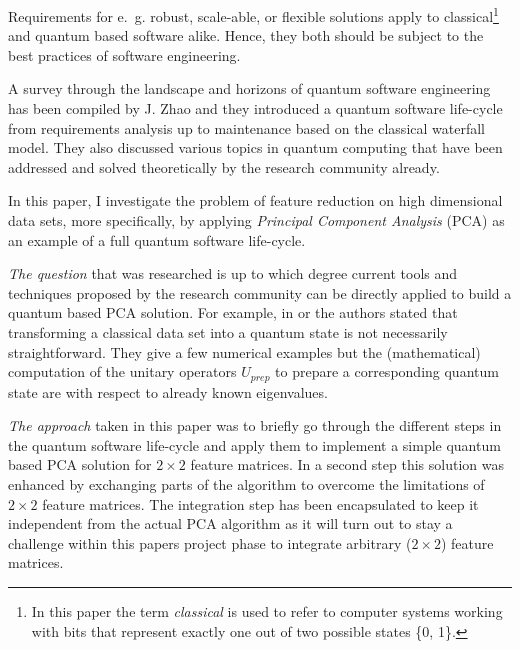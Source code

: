 
Requirements for e.~g. robust, scale-able, or flexible solutions apply to classical\footnote{In this paper the term \emph{classical} is used to refer to computer systems working with bits that represent exactly one out of two possible states \{0, 1\}.} and quantum based software alike. Hence, they both should be subject to the best practices of software engineering.

A survey through the landscape and horizons of quantum software engineering has been compiled by J. Zhao \cite{Zhao_2020} and they introduced a quantum software life-cycle from requirements analysis up to maintenance based on the classical waterfall model. They also discussed various topics in quantum computing that have been addressed and solved theoretically by the research community already.


In this paper, I investigate the problem of feature reduction on high dimensional data sets, more specifically, by applying \emph{Principal Component Analysis} (PCA) as an example of a full quantum software life-cycle.

\emph{The question} that was researched is up to which degree current tools and techniques proposed by the research community can be directly applied to build a quantum based PCA solution. For example, in \cite[p. 7]{He_2021} or \cite[pp. 4-5]{Daski_2015} the authors stated that transforming a classical data set into a quantum state is not necessarily straightforward. They give a few numerical examples but the (mathematical) computation of the unitary operators $U_{prep}$ to prepare a corresponding quantum state are with respect to already known eigenvalues.

\emph{The approach} taken in this paper was to briefly go through the different steps in the quantum software life-cycle and apply them to implement a simple quantum based PCA solution for $2 \times 2$ feature matrices. In a second step this solution was enhanced by exchanging parts of the algorithm to overcome the limitations of $2 \times 2$ feature matrices. The integration step has been encapsulated to keep it independent from the actual PCA algorithm as it will turn out to stay a challenge within this papers project phase to integrate arbitrary ($2 \times 2$) feature matrices.

